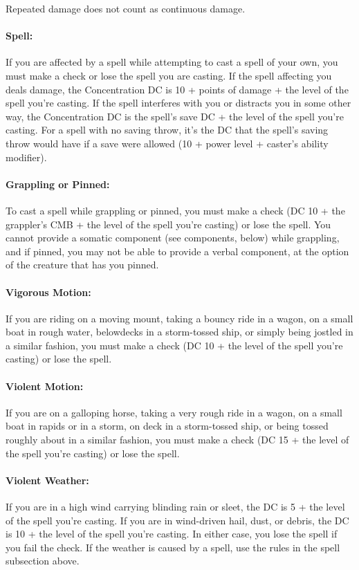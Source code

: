\documentclass[../VancianToPsionics.tex]{subfiles}
\begin{document}
Repeated damage does not count as continuous damage.

\paragraph{Spell:} If you are affected by a spell while attempting to cast a spell of your own, you must make a  check or lose the spell you are casting. If the spell affecting you deals damage, the Concentration DC is 10 + points of damage + the level of the spell you're casting. If the spell interferes with you or distracts you in some other way, the Concentration DC is the spell's save DC + the level of the spell you're casting. For a spell with no saving throw, it's the DC that the spell's saving throw would have if a save were allowed (10 + power level + caster's ability modifier).

\paragraph{Grappling or Pinned:} To cast a spell while grappling or pinned, you must make a  check (DC 10 + the grappler's CMB + the level of the spell you're casting) or lose the spell. You cannot provide a somatic component (see components, below) while grappling, and if pinned, you may not be able to provide a verbal component, at the option of the creature that has you pinned.

\paragraph{Vigorous Motion:} If you are riding on a moving mount, taking a bouncy ride in a wagon, on a small boat in rough water, belowdecks in a storm-tossed ship, or simply being jostled in a similar fashion, you must make a  check (DC 10 + the level of the spell you're casting) or lose the spell.

\paragraph{Violent Motion:} If you are on a galloping horse, taking a very rough ride in a wagon, on a small boat in rapids or in a storm, on deck in a storm-tossed ship, or being tossed roughly about in a similar fashion, you must make a  check (DC 15 + the level of the spell you're casting) or lose the spell.

\paragraph{Violent Weather:} If you are in a high wind carrying blinding rain or sleet, the DC is 5 + the level of the spell you're casting. If you are in wind-driven hail, dust, or debris, the DC is 10 + the level of the spell you're casting. In either case, you lose the spell if you fail the  check. If the weather is caused by a spell, use the rules in the spell subsection above.
\end{document}
